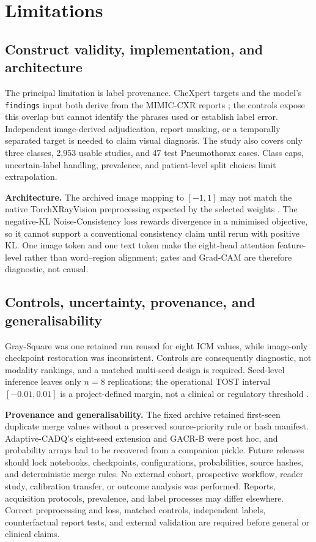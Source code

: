 
\section{Limitations}\label{sec:limitations}

\subsection{Construct validity, implementation, and architecture}
The principal limitation is label provenance. CheXpert targets and the model’s
\texttt{findings} input both derive from the MIMIC-CXR reports
\citep{johnson2019mimiccxr,irvin2019chexpert}; the controls expose this overlap
but cannot identify the phrases used or establish label error. Independent
image-derived adjudication, report masking, or a temporally separated target is
needed to claim visual diagnosis. The study also covers only three classes,
2,953 usable studies, and 47 test Pneumothorax cases. Class caps, uncertain-label
handling, prevalence, and patient-level split choices limit extrapolation.

\textbf{Architecture.}
The archived image mapping to $[-1,1]$ may not match the native
TorchXRayVision preprocessing expected by the selected weights
\citep{cohen2022torchxrayvision}. The negative-KL Noise-Consistency loss rewards
divergence in a minimised objective, so it cannot support a conventional
consistency claim until rerun with positive KL. One image token and one text
token make the eight-head attention feature-level rather than word--region
alignment; gates and Grad-CAM are therefore diagnostic, not causal.

\subsection{Controls, uncertainty, provenance, and generalisability}
Gray-Square was one retained run reused for eight ICM values, while image-only
checkpoint restoration was inconsistent. Controls are consequently diagnostic,
not modality rankings, and a matched multi-seed design is required. Seed-level
inference leaves only $n=8$ replications; the operational TOST interval
$[-0.01,0.01]$ is a project-defined margin, not a clinical or regulatory
threshold \citep{lakens2017equivalence}.

\textbf{Provenance and generalisability.}
The fixed archive retained first-seen duplicate merge values without a preserved
source-priority rule or hash manifest. Adaptive-CADQ’s eight-seed extension and
GACR-B were post hoc, and probability arrays had to be recovered from a
companion pickle. Future releases should lock notebooks, checkpoints,
configurations, probabilities, source hashes, and deterministic merge rules.
No external cohort, prospective workflow, reader study, calibration transfer,
or outcome analysis was performed. Reports, acquisition protocols, prevalence,
and label processes may differ elsewhere. Correct preprocessing and loss,
matched controls, independent labels, counterfactual report tests, and external
validation are required before general or clinical claims.
